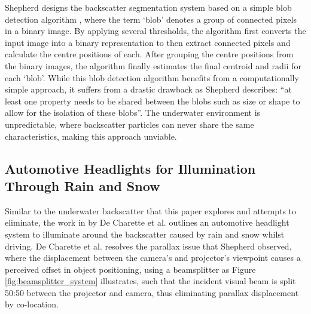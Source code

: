 Shepherd designs the backscatter segmentation system based on a simple blob detection algorithm \cite{opencvOpenCVCvSimpleBlobDetector}, where the term `blob' denotes a group of connected pixels in a binary image. By applying several thresholds, the algorithm first converts the input image into a binary representation to then extract connected pixels and calculate the centre positions of each. After grouping the centre positions from the binary images, the algorithm finally estimates the final centroid and radii for each `blob'. While this blob detection algorithm benefits from a computationally simple approach, it suffers from a drastic drawback as Shepherd describes: ``at least one property needs to be shared between the blobs such as size or shape to allow for the isolation of these blobs''. The underwater environment is unpredictable, where backscatter particles can never share the same characteristics, making this approach unviable.

\subsection{Automotive Headlights for Illumination Through Rain and Snow}
\label{autolights}

Similar to the underwater backscatter that this paper explores and attempts to eliminate, the work in \cite{decharetteFastReactiveControl2012} by De Charette et al. outlines an automotive headlight system to illuminate around the backscatter caused by rain and snow whilst driving. De Charette et al. resolves the parallax issue that Shepherd observed, where the displacement between the camera's and projector's viewpoint causes a perceived offset in object positioning, using a beamsplitter as Figure \ref{fig:beamsplitter_system} illustrates, such that the incident visual beam is split 50:50 between the projector and camera, thus eliminating parallax displacement by co-location.

